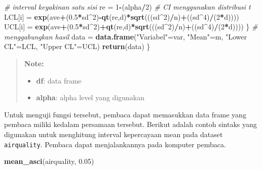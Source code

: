 \documentclass[]{book}
\newenvironment{Shaded}{\begin{snugshade}}{\end{snugshade}}
\newcommand{\KeywordTok}[1]{\textcolor[rgb]{0.13,0.29,0.53}{\textbf{#1}}}
\newcommand{\DecValTok}[1]{\textcolor[rgb]{0.00,0.00,0.81}{#1}}
\newcommand{\FloatTok}[1]{\textcolor[rgb]{0.00,0.00,0.81}{#1}}
\newcommand{\StringTok}[1]{\textcolor[rgb]{0.31,0.60,0.02}{#1}}
\newcommand{\CommentTok}[1]{\textcolor[rgb]{0.56,0.35,0.01}{\textit{#1}}}
\newcommand{\OperatorTok}[1]{\textcolor[rgb]{0.81,0.36,0.00}{\textbf{#1}}}
\newcommand{\NormalTok}[1]{#1}
\providecommand{\tightlist}{%
  \setlength{\itemsep}{0pt}\setlength{\parskip}{0pt}}
\begin{document}
\begin{Shaded}
\begin{Highlighting}[]
    \CommentTok{# interval keyakinan satu sisi}
\NormalTok{    re =}\StringTok{ }\DecValTok{1}\OperatorTok{-}\NormalTok{(alpha}\OperatorTok{/}\DecValTok{2}\NormalTok{)}
    \CommentTok{# CI menggunakan distribusi t}
\NormalTok{    LCL[i] =}\StringTok{ }\KeywordTok{exp}\NormalTok{(ave}\OperatorTok{+}\NormalTok{(}\FloatTok{0.5}\OperatorTok{*}\NormalTok{sd}\OperatorTok{^}\DecValTok{2}\NormalTok{)}\OperatorTok{-}\KeywordTok{qt}\NormalTok{(re,d)}\OperatorTok{*}\KeywordTok{sqrt}\NormalTok{(((sd}\OperatorTok{^}\DecValTok{2}\NormalTok{)}\OperatorTok{/}\NormalTok{n)}\OperatorTok{+}\NormalTok{((sd}\OperatorTok{^}\DecValTok{4}\NormalTok{)}\OperatorTok{/}\NormalTok{(}\DecValTok{2}\OperatorTok{*}\NormalTok{d))))}
\NormalTok{    UCL[i] =}\StringTok{ }\KeywordTok{exp}\NormalTok{(ave}\OperatorTok{+}\NormalTok{(}\FloatTok{0.5}\OperatorTok{*}\NormalTok{sd}\OperatorTok{^}\DecValTok{2}\NormalTok{)}\OperatorTok{+}\KeywordTok{qt}\NormalTok{(re,d)}\OperatorTok{*}\KeywordTok{sqrt}\NormalTok{(((sd}\OperatorTok{^}\DecValTok{2}\NormalTok{)}\OperatorTok{/}\NormalTok{n)}\OperatorTok{+}\NormalTok{((sd}\OperatorTok{^}\DecValTok{4}\NormalTok{)}\OperatorTok{/}\NormalTok{(}\DecValTok{2}\OperatorTok{*}\NormalTok{d))))}
\NormalTok{  \}}
  \CommentTok{# menggabungkan hasil}
\NormalTok{  data =}\StringTok{ }\KeywordTok{data.frame}\NormalTok{(}\StringTok{"Variabel"}\NormalTok{=var,}
                    \StringTok{"Mean"}\NormalTok{=m,}
                    \StringTok{"Lower CL"}\NormalTok{=LCL,}
                    \StringTok{"Upper CL"}\NormalTok{=UCL)}
  \KeywordTok{return}\NormalTok{(data)}
\NormalTok{\}}
\end{Highlighting}
\end{Shaded}

\begin{quote}
\textbf{Note: }

\begin{itemize}
\tightlist
\item
  \textbf{df}: data frame
\item
  \textbf{alpha}: alpha level yang digunakan
\end{itemize}
\end{quote}

Untuk menguji fungsi tersebut, pembaca dapat memasukkan data frame yang
pembaca miliki kedalam persamaan tersebut. Berikut adalah contoh sintaks
yang digunakan untuk menghitung interval kepercayaan mean pada dataset
\texttt{airquality}. Pembaca dapat menjalankannya pada komputer pembaca.

\begin{Shaded}
\begin{Highlighting}[]
\KeywordTok{mean_asci}\NormalTok{(airquality, }\FloatTok{0.05}\NormalTok{)}
\end{Highlighting}
\end{Shaded}
\end{document}
